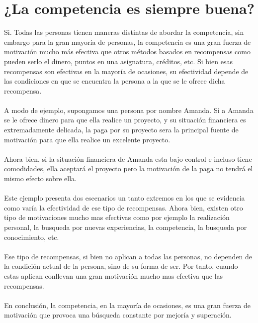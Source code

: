 \documentclass{article}
\begin{document}
\section {¿La competencia es siempre buena?}
Si. Todas las personas tienen maneras distintas de abordar
la competencia, sin embargo para la gran mayoría de personas, 
la competencia
es una gran fuerza de motivación mucho más efectiva que otros métodos
basados en recompensas como pueden serlo el dinero, 
puntos en una asignatura, créditos, etc. Si bien esas recompensas 
son efectivas en la mayoría de ocasiones, su efectividad depende 
de las condiciones en que se encuentra la persona a la que se 
le ofrece dicha recompensa. \\\\
A modo de ejemplo, supongamos una persona por nombre Amanda. 
Si a Amanda se le ofrece dinero para que ella realice un proyecto, y 
su situación financiera es extremadamente delicada, la paga por su 
proyecto sera la principal fuente de motivación para que ella 
realice un excelente proyecto. \\\\
Ahora bien, si la situación financiera de Amanda esta bajo control 
e incluso tiene comodidades, ella aceptará el proyecto pero
la motivación de la paga no tendrá el mismo efecto sobre ella. \\\\
Este ejemplo presenta dos escenarios un tanto extremos en los que 
se evidencia como varía la efectividad de ese tipo de recompensas. 
Ahora bien, existen otro tipo de motivaciones mucho mas efectivas como 
por ejemplo la realización personal, la busqueda por nuevas experiencias,
la competencia, la busqueda por conocimiento, etc. \\\\
Ese tipo de recompensas, si bien no aplican a todas las personas, 
no dependen de la condición actual de la persona, sino de su forma 
de ser. Por tanto, cuando estas aplican conllevan una gran motivación
mucho mas efectiva que las recompensas.\\\\

En conclusión, la competencia, en la mayoría de ocasiones, 
es una gran fuerza de motivación que provoca una búsqueda constante 
por mejoría y superación.
\end{document}
